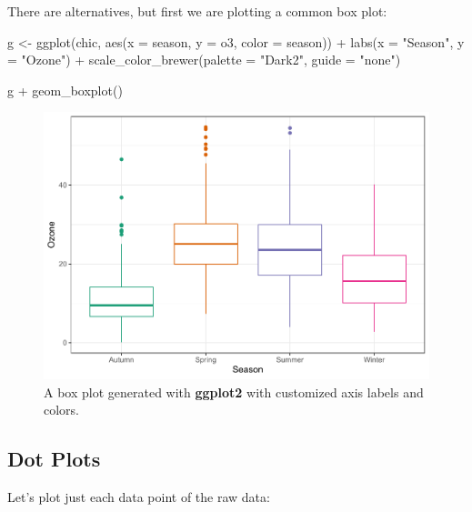 \documentclass[
]{krantz}
\makeatletter
\newenvironment{Shaded}{\begin{snugshade}}{\end{snugshade}}
\newcommand{\AttributeTok}[1]{\textcolor[rgb]{0.61,0.61,0.61}{#1}}
\newcommand{\FunctionTok}[1]{\textcolor[rgb]{0,0,0}{#1}}
\newcommand{\NormalTok}[1]{#1}
\newcommand{\OtherTok}[1]{\textcolor[rgb]{0.37,0.37,0.37}{#1}}
\newcommand{\SpecialCharTok}[1]{\textcolor[rgb]{0,0,0}{#1}}
\newcommand{\StringTok}[1]{\textcolor[rgb]{0.5,0.5,0.5}{#1}}
\newenvironment{kframe}{%
\medskip{}
\setlength{\fboxsep}{.8em}
 \def\at@end@of@kframe{}%
 \ifinner\ifhmode%
  \def\at@end@of@kframe{\end{minipage}}%
  \begin{minipage}{\columnwidth}%
 \fi\fi%
 \def\FrameCommand##1{\hskip\@totalleftmargin \hskip-\fboxsep
 \colorbox{shadecolor}{##1}\hskip-\fboxsep
     \hskip-\linewidth \hskip-\@totalleftmargin \hskip\columnwidth}%
 \MakeFramed {\advance\hsize-\width
   \@totalleftmargin\z@ \linewidth\hsize
   \@setminipage}}%
 {\par\unskip\endMakeFramed%
 \at@end@of@kframe}
\renewenvironment{Shaded}{\begin{kframe}}{\end{kframe}}
\makeatother
\begin{document}
There are alternatives, but first we are plotting a common box plot:

\begin{Shaded}
\begin{Highlighting}[]
\NormalTok{g }\OtherTok{\textless{}{-}}
  \FunctionTok{ggplot}\NormalTok{(chic, }\FunctionTok{aes}\NormalTok{(}\AttributeTok{x =}\NormalTok{ season, }\AttributeTok{y =}\NormalTok{ o3,}
                   \AttributeTok{color =}\NormalTok{ season)) }\SpecialCharTok{+}
    \FunctionTok{labs}\NormalTok{(}\AttributeTok{x =} \StringTok{"Season"}\NormalTok{, }\AttributeTok{y =} \StringTok{"Ozone"}\NormalTok{) }\SpecialCharTok{+}
    \FunctionTok{scale\_color\_brewer}\NormalTok{(}\AttributeTok{palette =} \StringTok{"Dark2"}\NormalTok{, }\AttributeTok{guide =} \StringTok{"none"}\NormalTok{)}

\NormalTok{g }\SpecialCharTok{+} \FunctionTok{geom\_boxplot}\NormalTok{()}
\end{Highlighting}
\end{Shaded}

\begin{figure}
\centering
\includegraphics{bookdown_files/figure-latex/boxplot-1.pdf}
\caption{\label{fig:boxplot}A box plot generated with \textbf{ggplot2} with customized axis labels and colors.}
\end{figure}

\hypertarget{dot-plots}{%
\subsection{Dot Plots}\label{dot-plots}}

Let's plot just each data point of the raw data:
\end{document}
